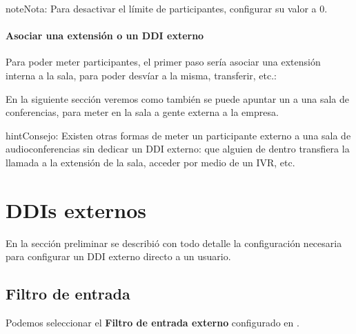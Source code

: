\documentclass[letterpaper,10pt,spanish]{sphinxmanual}
\begin{document}
\begin{notice}{note}{Nota:}
Para desactivar el límite de participantes, configurar su valor a 0.
\end{notice}
\paragraph{Asociar una extensión o un DDI externo}

Para poder meter participantes, el primer paso sería asociar una extensión interna a la sala, para poder desvíar a la misma, transferir, etc.:

\noindent{}

En la siguiente sección veremos como también se puede apuntar un {\hyperref[pbx_features/external_ddis:external\string-ddis]{}} a una sala de conferencias, para meter en la sala a gente externa a la empresa.

\begin{notice}{hint}{Consejo:}
Existen otras formas de meter un participante externo a una sala de audioconferencias sin dedicar un DDI externo: que alguien de dentro transfiera la llamada a la extensión de la sala, acceder por medio de un IVR, etc.
\end{notice}


\section{DDIs externos}
\label{pbx_features/external_ddis:external-ddis}\label{pbx_features/external_ddis::doc}\label{pbx_features/external_ddis:id1}
En la sección preliminar {\hyperref[external_incoming_calls/configure_ddi:settingup\string-ddi]{}} se describió con todo detalle la configuración necesaria para configurar un DDI externo directo a un usuario.


\subsection{Filtro de entrada}
\label{pbx_features/external_ddis:ddi-external-filters}
Podemos seleccionar el \textbf{Filtro de entrada externo} configurado en {\hyperref[pbx_features/external_filters:external\string-filters]{}}.

\noindent{}
\end{document}

